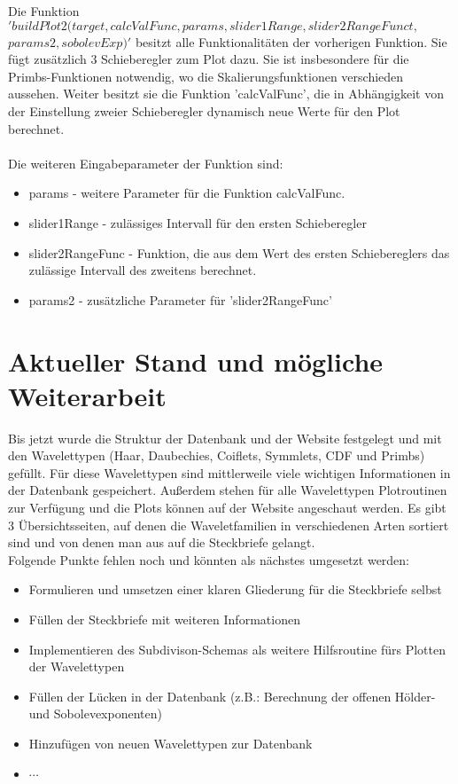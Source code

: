 \documentclass[11pt,a4paper,titlepage]{article}
\theoremstyle{plain} %
\theoremstyle{definition} %
\numberwithin{equation}{section} %
\begin{document}
		Die Funktion $'buildPlot2(target, calcValFunc, params, slider1Range, slider2RangeFunct,$ \\
		$params2, sobolevExp)'$ besitzt alle Funktionalitäten der vorherigen Funktion. Sie fügt zusätzlich 3 Schieberegler zum Plot dazu. Sie ist insbesondere für die Primbs-Funktionen notwendig, wo die Skalierungsfunktionen verschieden aussehen. Weiter besitzt sie die Funktion 'calcValFunc', die in Abhängigkeit von der Einstellung zweier Schieberegler dynamisch neue Werte für den Plot berechnet.\\
		\\
		Die weiteren Eingabeparameter der Funktion sind:
		\begin{itemize}
			\item params - weitere Parameter für die Funktion calcValFunc.
			\item slider1Range - zulässiges Intervall für den ersten Schieberegler
			\item slider2RangeFunc - Funktion, die aus dem Wert des ersten Schiebereglers das zulässige Intervall des zweitens berechnet.
			\item params2 - zusätzliche Parameter für 'slider2RangeFunc'
		\end{itemize}
		
		\section{Aktueller Stand und mögliche Weiterarbeit}
		Bis jetzt wurde die Struktur der Datenbank und der Website festgelegt und mit den Wavelettypen (Haar, Daubechies, Coiflets, Symmlets, CDF und Primbs) gefüllt. 
		Für diese Wavelettypen sind mittlerweile viele wichtigen Informationen in der Datenbank gespeichert. Außerdem stehen für alle Wavelettypen Plotroutinen zur Verfügung und die Plots können auf der Website angeschaut werden. Es gibt 3 Übersichtsseiten, auf denen die Waveletfamilien in verschiedenen Arten sortiert sind und von denen man aus auf die Steckbriefe gelangt.\\
		
		Folgende Punkte fehlen noch und könnten als nächstes umgesetzt werden:
		\begin{itemize}
			\item Formulieren und umsetzen einer klaren Gliederung für die Steckbriefe selbst
			\item Füllen der Steckbriefe mit weiteren Informationen
			\item Implementieren des Subdivison-Schemas als weitere Hilfsroutine fürs Plotten der Wavelettypen
			\item Füllen der Lücken in der Datenbank (z.B.: Berechnung der offenen Hölder- und Sobolevexponenten)
			\item Hinzufügen von neuen Wavelettypen zur Datenbank
			\item $\cdots$
		\end{itemize}
		
\end{document}
